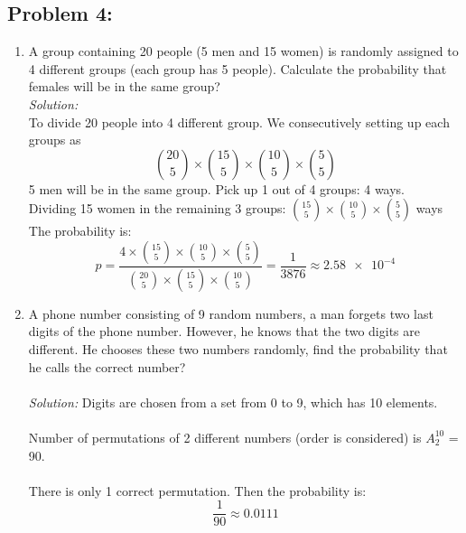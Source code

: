 \documentclass[a4paper]{article}
\begin{document}
\subsection*{Problem 4:}
\begin{enumerate}
	\item A group containing 20 people (5 men and 15 women) is randomly assigned to 4 different groups (each group has 5 people). Calculate the probability that females will be in the same group? \\
	      \textit{Solution:}\\
	      To divide 20 people into 4 different group. We consecutively setting up each groups as
	      \begin{equation*} 
		      {20 \choose 5} \times {15 \choose 5} \times {10 \choose 5} \times {5 \choose 5}
	      \end{equation*}
	      5 men will be in the same group. Pick up 1 out of 4 groups: 4 ways. \\
	      Dividing 15 women in the remaining 3 groups: ${15 \choose 5} \times {10 \choose 5} \times {5 \choose 5}$ ways \\
	      The probability is: 
	      \begin{equation*}
		      p = \frac{4 \times {15 \choose 5} \times {10 \choose 5} \times {5 \choose 5}}{{20 \choose 5} \times {15 \choose 5} \times {10 \choose 5}}  = \frac{1}{3876} \approx \num{2.58e-4}
	      \end{equation*}
	\item A phone number consisting of 9 random numbers, a man forgets two last digits of the phone number. However, he knows that the two digits are different. He chooses these two numbers randomly, find the probability that he calls the correct number?\\\\
	      \textit{Solution:}
	      Digits are chosen from a set from 0 to 9, which has 10 elements.\\\\
	      Number of permutations of 2 different numbers (order is considered) is $A_{2}^{10}$ = 90.\\\\
	      There is only 1 correct permutation. Then the probability is:
	      \begin{equation*}
		      \frac{1}{90} \approx 0.0111 
	      \end{equation*}
	      

\end{enumerate}
\end{document}
